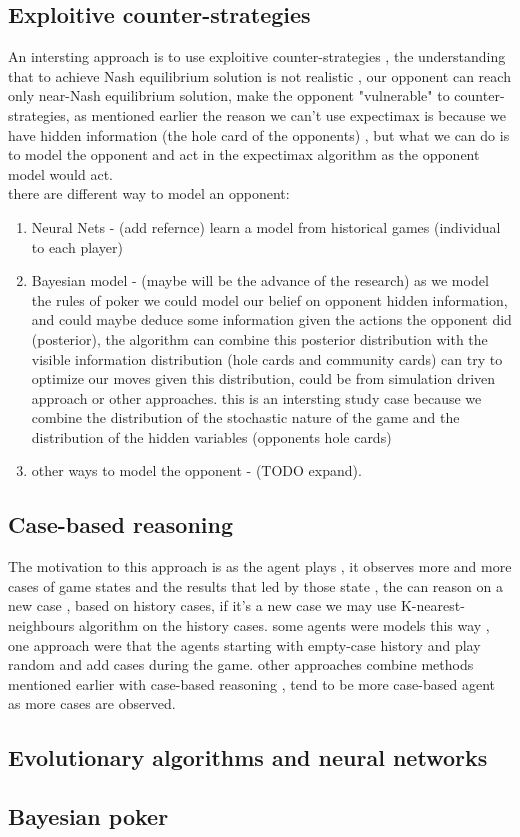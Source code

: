 \documentclass{article}
\begin{document}
\subsection{Exploitive counter-strategies}
An intersting approach is to use exploitive counter-strategies , the understanding that to achieve Nash equilibrium solution is not realistic , our opponent can reach only near-Nash equilibrium solution, make the opponent "vulnerable" to counter-strategies, as mentioned earlier the reason we can't use expectimax is because we have hidden information (the hole card of the opponents) , but what we can do is to model the opponent and act in the expectimax algorithm as the opponent model would act.\\
there are different way to model an opponent: \\
\begin{enumerate}
\item Neural Nets - (add refernce) learn a model from historical games (individual to each player) \\
\item Bayesian model - (maybe will be the advance of the research) as we model the rules of poker we could model our belief on opponent hidden information, and could maybe deduce some information given the actions the opponent did (posterior), the algorithm can combine this posterior distribution with the visible information distribution (hole cards and community cards)  can try to optimize our moves given this distribution, could be from simulation driven approach or other approaches. this is an intersting study case because we combine the distribution of the stochastic nature of the game and the distribution of the hidden variables (opponents hole cards)\\
\item other ways to model the opponent - (TODO expand).
\end{enumerate}

\subsection{Case-based reasoning}
The motivation to this approach is as the agent plays , it observes more and more cases of game states and the results that led by those state , the can reason on a new case , based on history cases, if it's a new case we may use K-nearest-neighbours algorithm on the history cases. 
some agents were models this way , one approach were that the agents starting with empty-case history and play random and add cases during the game. other approaches combine 
methods mentioned earlier with case-based reasoning , tend to be more case-based agent as more cases are observed. 
\subsection{Evolutionary algorithms and neural networks}

\subsection{Bayesian poker}
\end{document}
